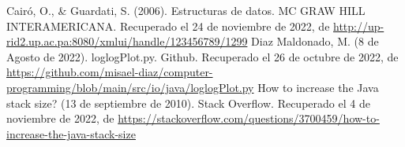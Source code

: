 \begin{thebibliography}{1}

Cairó, O., \& Guardati, S. (2006). Estructuras de datos. MC GRAW HILL INTERAMERICANA. Recuperado el 24 de noviembre de 2022, de  \url{http://up-rid2.up.ac.pa:8080/xmlui/handle/123456789/1299}
Diaz Maldonado, M. (8 de Agosto de 2022). loglogPlot.py. Github. Recuperado el 26 de octubre de 2022, de \url{https://github.com/misael-diaz/computer-programming/blob/main/src/io/java/loglogPlot.py}
How to increase the Java stack size? (13 de septiembre de 2010). Stack Overflow. Recuperado el 4 de noviembre de 2022, de  \url{https://stackoverflow.com/questions/3700459/how-to-increase-the-java-stack-size}

\end{thebibliography}
